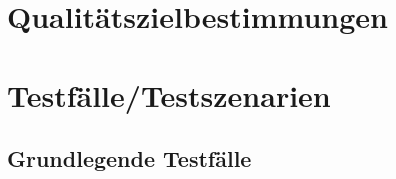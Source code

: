 \documentclass[a4paper,12pt]{article}
\begin{document}
\section{Qualitätszielbestimmungen}

\clearpage
\section{Testfälle/Testszenarien}
\subsection{Grundlegende Testfälle}
\end{document}
